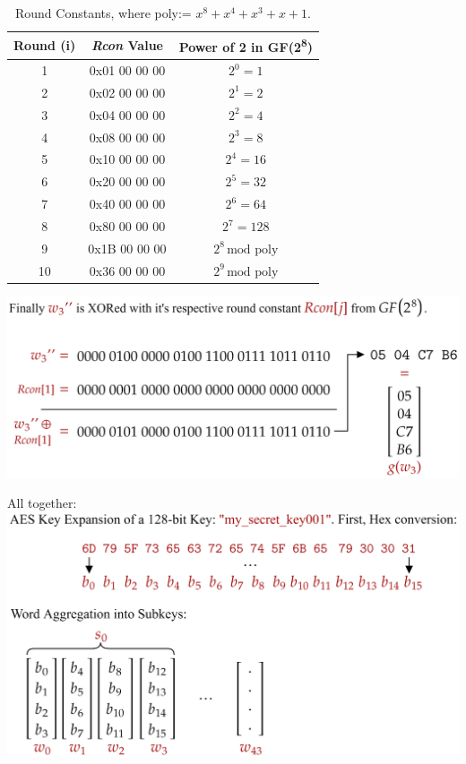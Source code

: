 \begin{table}[h!]
    \centering
    \renewcommand{\arraystretch}{1.4}
    \begin{tabular}{|c|c|c|}
    \hline
    \textbf{Round (i)} & \textbf{\textit{Rcon} Value} & \textbf{Power of 2 in GF(2\textsuperscript{8})} \\
    \hline
    1  & 0x01 00 00 00 & $2^0 = 1$     \\
    2  & 0x02 00 00 00 & $2^1 = 2$     \\
    3  & 0x04 00 00 00 & $2^2 = 4$     \\
    4  & 0x08 00 00 00 & $2^3 = 8$     \\
    5  & 0x10 00 00 00 & $2^4 = 16$    \\
    6  & 0x20 00 00 00 & $2^5 = 32$    \\
    7  & 0x40 00 00 00 & $2^6 = 64$    \\
    8  & 0x80 00 00 00 & $2^7 = 128$   \\
    9  & 0x1B 00 00 00 & $2^8 \, \text{mod poly}$ \\
    10 & 0x36 00 00 00 & $2^9 \, \text{mod poly}$ \\
    \hline
    \end{tabular}
    \caption{Round Constants, where poly:= $x^8 + x^4 + x^3 + x + 1$.}
    \label{tab:rcon-values}
\end{table}


\hspace{-3em}
\includegraphics[width=1\textwidth]{Sections/sec/enc/aes/rcon.png}

\newpage 

\noindent
All together:\\

\hspace{-2em}
\includegraphics[width=1\textwidth]{Sections/sec/enc/aes/recap1.png}

